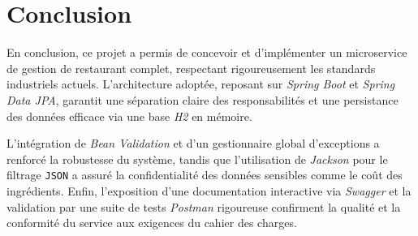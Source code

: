 \documentclass[12pt,a4paper,french]{article}
\begin{document}
\section{Conclusion}
En conclusion, ce projet a permis de concevoir et d'implémenter un microservice de gestion
de restaurant complet, respectant rigoureusement les standards industriels actuels.
L'architecture adoptée, reposant sur \textit{Spring Boot} et \textit{Spring Data JPA},
garantit une séparation claire des responsabilités et une persistance des données
efficace via une base \textit{H2} en mémoire.

L'intégration de \textit{Bean Validation} et d'un gestionnaire global d'exceptions a
renforcé la robustesse du système, tandis que l'utilisation de \textit{Jackson} pour
le filtrage \texttt{JSON} a assuré la confidentialité des données sensibles comme
le coût des ingrédients. Enfin, l'exposition d'une documentation interactive via
\textit{Swagger} et la validation par une suite de tests \textit{Postman} rigoureuse
confirment la qualité et la conformité du service aux exigences du cahier des charges.
\end{document}
